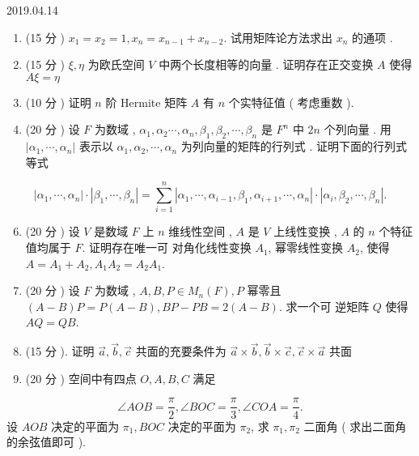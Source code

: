 \documentclass[10pt]{article}
\begin{document}
   

2019.04.14

\begin{enumerate}
  \item (15  分 ) $x_{1}=x_{2}=1, x_{n}=x_{n-1}+x_{n-2}$.  试用矩阵论方法求出  $x_{n}$  的通项 .

  \item (15  分 ) $\xi, \eta$  为欧氏空间  $V$  中两个长度相等的向量 .  证明存在正交变换  $A$  使得  $A \xi=\eta$

  \item (10  分 )  证明  $n$  阶  Hermite  矩阵  $A$  有  $n$  个实特征值  ( 考虑重数 ).

  \item (20  分 )  设  $F$  为数域 , $\alpha_{1}, \alpha_{2} \cdots, \alpha_{n}, \beta_{1}, \beta_{2}, \cdots, \beta_{n}$  是  $F^{n}$  中  $2 n$  个列向量 .  用  $\left|\alpha_{1}, \cdots, \alpha_{n}\right|$  表示以  $\alpha_{1}, \alpha_{2}, \cdots, \alpha_{n}$  为列向量的矩阵的行列式 .  证明下面的行列式等式 

\end{enumerate}
$$
\left|\alpha_{1}, \cdots, \alpha_{n}\right| \cdot\left|\beta_{1}, \cdots, \beta_{n}\right|=\sum_{i=1}^{n}\left|\alpha_{1}, \cdots, \alpha_{i-1}, \beta_{1}, \alpha_{i+1}, \cdots, \alpha_{n}\right| \cdot\left|\alpha_{i}, \beta_{2}, \cdots, \beta_{n}\right| .
$$

\begin{enumerate}
  \setcounter{enumi}{5}
  \item (20  分 )  设  $V$  是数域  $F$  上  $n$  维线性空间 , $A$  是  $V$  上线性变换 , $A$  的  $n$  个特征值均属于  $F$.  证明存在唯一可   对角化线性变换  $A_{1}$,  幂零线性变换  $A_{2}$,  使得  $A=A_{1}+A_{2}, A_{1} A_{2}=A_{2} A_{1}$.

  \item (20  分 )  设  $F$  为数域 , $A, B, P \in M_{n}(F), P$  幂零且  $(A-B) P=P(A-B), B P-P B=2(A-B)$.  求一个可   逆矩阵  $Q$  使得  $A Q=Q B$.

  \item (15  分 ).  证明  $\vec{a}, \vec{b}, \vec{c}$  共面的充要条件为  $\vec{a} \times \vec{b}, \vec{b} \times \vec{c}, \vec{c} \times \vec{a}$  共面 

  \item (20  分 )  空间中有四点  $O, A, B, C$  满足 

\end{enumerate}
$$
\angle A O B=\frac{\pi}{2}, \angle B O C=\frac{\pi}{3}, \angle C O A=\frac{\pi}{4} .
$$
 设  $A O B$  决定的平面为  $\pi_{1}, B O C$  决定的平面为  $\pi_{2}$,  求  $\pi_{1}, \pi_{2}$  二面角  ( 求出二面角的余弦值即可 ).
\end{document}
